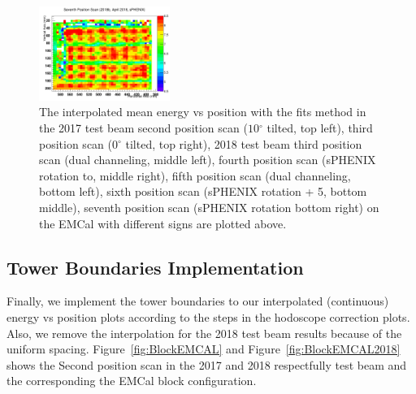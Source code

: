 \documentclass[hidelinks,11pt]{article}
\numberwithin{figure}{section}
\numberwithin{table}{section}
\newcommand{\degree}{\mbox{$^\circ$}\xspace}
\begin{document}
\begin{figure}[hbtp]
\begin{center}
\includegraphics[width=0.38\textwidth]{Plots/InterFits/Inter20187thScan.png}
\caption{The interpolated mean energy vs position with the fits method in the 2017 test beam second position scan ($10 \degree$ tilted, top left), third position scan ($0 \degree$ tilted, top right), 2018 test beam third position scan (dual channeling, middle left), fourth position scan (sPHENIX rotation to, middle right), fifth position scan (dual channeling, bottom left), sixth position scan (sPHENIX rotation + 5, bottom middle),  seventh position scan (sPHENIX rotation bottom right) on the EMCal with different signs are plotted above.}
\label{fig:FitsMethods}
\end{center}
\end{figure} 

\subsection{Tower Boundaries Implementation}

Finally, we implement the tower boundaries to our interpolated (continuous) energy vs position plots according to the steps in the hodoscope correction plots. Also, we remove the interpolation for the 2018 test beam results because of the uniform spacing. Figure~\ref{fig:BlockEMCAL} and Figure~\ref{fig:BlockEMCAL2018} shows the Second position scan in the 2017 and 2018 respectfully test beam and the corresponding the EMCal block configuration. 
\end{document}
